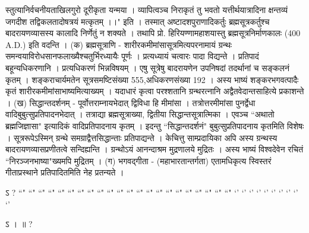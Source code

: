 स्तुत्यानिर्वचनीयताखिलगुरो दूरीकृता यन्मया ।
व्यापित्वञ्च निराकृतं तु भवतो यत्तीर्थयात्रादिना
क्षन्तव्यं जगदीश तद्विकलतादोषत्रयं मत्कृतम् ।।" इति ।
तस्मात् अष्टादशपुराणादिकर्तुः ब्रह्मसूत्रकर्तुश्च बादरायणव्यासस्य कालादि निर्णेतुं न शक्यते । तथापि प्रो. हिरियण्णामहाशयास्तु ब्रह्मसूत्रनिर्माणकालः (400 A.D.) इति वदन्ति ।
(क) ब्रह्मसूत्राणि - शारीरकमीमांसासूत्रमित्यपरनामायं ग्रन्थः समन्वयाविरोधसानफलाख्यैश्चतुर्भिरध्यायैः पूर्णः । प्रत्यध्यायं चत्वारः पादा विद्यन्ते । प्रतिपादं बहून्यधिकरणानि । प्रत्यधिकरणं भिन्नविषयम् । एषु सूत्रेषु बादरायणेन उपनिषदां तदर्थानां च सङ्कलनं कृतम् । शङ्कराचार्यमतेन सूत्रसमष्टिसंख्या 555,अधिकरणसंख्या 192 । अस्य भाष्यं शङ्करभगवत्पादैः कृतं शारीरकमीमांसाभाष्यमित्याख्यम् । यदाधारं कृत्वा परश्शतानि ग्रन्थरत्नानि अद्वैतवेदान्तसाहित्ये प्रकाशन्ते ।
(ख) सिद्धान्तदर्शनम् - पूर्वोत्तराम्नायभेदात् द्विविधा हि मीमांसा । तत्रोत्तरमीमांसा पुनर्द्वेधा वादिबुबुत्सुप्रतिपादनभेदात् । तत्राद्या ब्रह्मसूत्राख्या, द्वितीया सिद्धान्तसूत्रात्मिका । एवञ्च ``अथातो ब्रह्मजिज्ञासा" इत्यादिकं वादिप्रतिपादनाय कृतम् । इदन्तु ``सिद्धान्तदर्शनं" बुबुत्सुप्रतिपादनाय कृतमिति विशेषः । सूत्ररूपेऽस्मिन् ग्रन्थे समग्राद्वैत्तसिद्धान्ताः प्रतिपाद्यन्ते । केचित्तु साम्प्रदायिका अपि अस्य ग्रन्थस्य बादरायणव्यासप्रणीतत्वे सन्दिह्यन्ति । ग्रन्थोऽयं आनन्दाश्रम मुद्रणालये मुद्रितः । अस्य भाष्यं विश्वदेवेन रचितं ``निरञ्जनभाष्या"ख्यमपि मुद्रितम् ।
(ग) भगवद्गीता - (महाभारतान्तर्गता) एतामधिकृत्य स्विस्तरं गीताप्रस्थाने प्रतिपादितमिति नेह प्रतन्यते ।



ऽ  ?
``" ``" ``" ``" ``" ``" ``" ``" ``" ``" ``"
``" ``" ``" ``" ``" ``" ``" ``" ``" ``" ``"
`' `' `' `' `' `' `' `' `' `' 

ऽ  ।   ॥ ?
